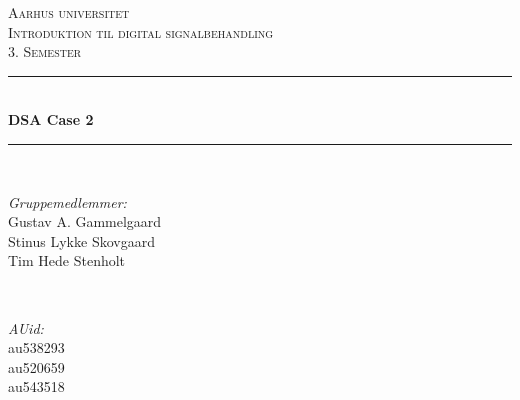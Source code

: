 \documentclass[12pt]{article}
\begin{document}
\begin{titlepage}



\newcommand{\HRule}{\rule{\linewidth}{0.5mm}} %
\setlength{\topmargin}{0in}
\centering %

\textsc{\LARGE Aarhus universitet}\\[1.5cm] %
\textsc{\Large Introduktion til digital signalbehandling}\\[0.5cm] %
\textsc{\large 3. Semester}\\[0.5cm] %


\HRule \\[0.4cm]
{ \huge \bfseries DSA Case 2}\\ %
\HRule \\[1cm]
 

\begin{minipage}{0.4\textwidth}
	\begin{flushleft} \large
		\emph{Gruppemedlemmer:}\\
		Gustav A. Gammelgaard \\
		Stinus Lykke Skovgaard \\
		Tim Hede Stenholt \\ [0.5cm]
	\end{flushleft}
\end{minipage}
~
\begin{minipage}{0.4\textwidth}
	\begin{flushright} \large
		\emph{AUid:} \\
		au538293\\
		au520659\\
		au543518\\ [0.5cm]
	\end{flushright}
\end{minipage}\\[5cm]


\end{titlepage}
\end{document}
